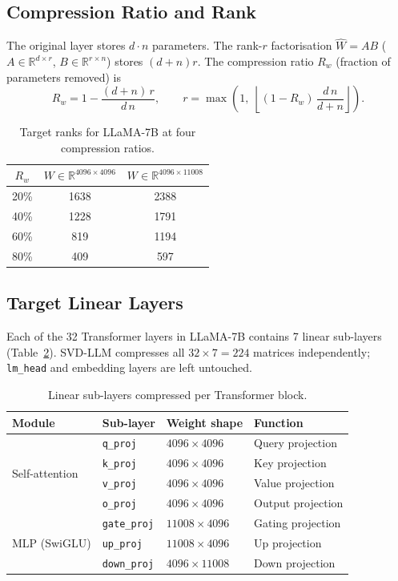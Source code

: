 \documentclass[11pt,a4paper]{article}
\newcommand{\Rbb}{\mathbb{R}}
\theoremstyle{remark}
\begin{document}
\subsection{Compression Ratio and Rank}

The original layer stores $d \cdot n$ parameters.  The rank-$r$ factorisation
$\hat{W} = AB$ ($A \in \Rbb^{d \times r}$, $B \in \Rbb^{r \times n}$) stores
$(d+n)r$.  The compression ratio $R_w$ (fraction of parameters removed) is
\begin{equation}
  \label{eq:ratio}
  R_w = 1 - \frac{(d+n)\,r}{d\,n},
  \qquad
  r = \max\!\left(1,\;\left\lfloor (1-R_w)\,\frac{d\,n}{d+n}\right\rfloor\right).
\end{equation}

\begin{table}[H]
\centering
\caption{Target ranks for LLaMA-7B at four compression ratios.}
\label{tab:rank}
\begin{tabular}{@{}ccc@{}}
\toprule
$R_w$ & $W\in\Rbb^{4096\times 4096}$ & $W\in\Rbb^{4096\times 11008}$ \\
\midrule
20\% & 1638 & 2388 \\
40\% & 1228 & 1791 \\
60\% &  819 & 1194 \\
80\% &  409 &  597 \\
\bottomrule
\end{tabular}
\end{table}

\subsection{Target Linear Layers}

Each of the 32 Transformer layers in LLaMA-7B contains 7 linear sub-layers
(Table~\ref{tab:layers}).  SVD-LLM compresses all $32 \times 7 = 224$ matrices
independently; \texttt{lm\_head} and embedding layers are left untouched.

\begin{table}[H]
\centering
\caption{Linear sub-layers compressed per Transformer block.}
\label{tab:layers}
\small
\begin{tabular}{@{}llll@{}}
\toprule
\textbf{Module} & \textbf{Sub-layer} & \textbf{Weight shape} & \textbf{Function} \\
\midrule
\multirow{4}{*}{Self-attention}
  & \texttt{q\_proj} & $4096 \times 4096$ & Query projection \\
  & \texttt{k\_proj} & $4096 \times 4096$ & Key projection \\
  & \texttt{v\_proj} & $4096 \times 4096$ & Value projection \\
  & \texttt{o\_proj} & $4096 \times 4096$ & Output projection \\
\midrule
\multirow{3}{*}{MLP (SwiGLU)}
  & \texttt{gate\_proj} & $11008 \times 4096$ & Gating projection \\
  & \texttt{up\_proj}   & $11008 \times 4096$ & Up projection \\
  & \texttt{down\_proj} & $4096 \times 11008$ & Down projection \\
\bottomrule
\end{tabular}
\end{table}
\end{document}

